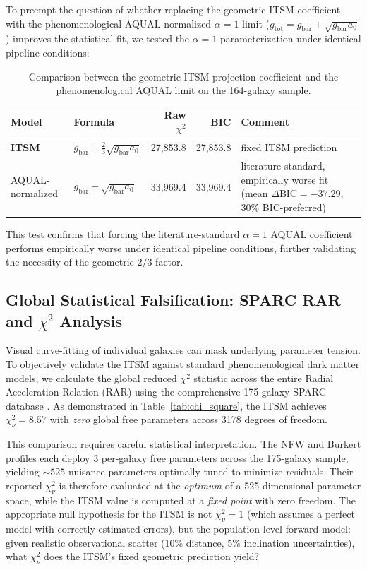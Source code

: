 \documentclass[aps,prd,10pt,twocolumn,superscriptaddress,nofootinbib,floatfix]{revtex4-2}
\begin{document}
To preempt the question of whether replacing the geometric ITSM coefficient with the phenomenological AQUAL-normalized $\alpha=1$ limit ($g_{\text{tot}} = g_{\text{bar}} + \sqrt{g_{\text{bar}}a_0}$) improves the statistical fit, we tested the $\alpha=1$ parameterization under identical pipeline conditions:

\begin{table}[htbp]
\centering
\caption{\footnotesize Comparison between the geometric ITSM projection coefficient and the phenomenological AQUAL limit on the 164-galaxy sample.}
\label{tab:aqual}
\begin{tabular}{llrrp{5cm}}
\toprule
\textbf{Model} & \textbf{Formula} & \textbf{Raw $\chi^2$} & \textbf{BIC} & \textbf{Comment} \\
\midrule
\textbf{ITSM} & $g_{\text{bar}}+\frac{2}{3}\sqrt{g_{\text{bar}}a_0}$ & 27,853.8 & 27,853.8 & fixed ITSM prediction \\
AQUAL-normalized & $g_{\text{bar}}+\sqrt{g_{\text{bar}}a_0}$ & 33,969.4 & 33,969.4 & literature-standard, empirically worse fit (mean $\Delta\text{BIC} = -37.29$, 30\% BIC-preferred) \\
\bottomrule
\end{tabular}
\end{table}

This test confirms that forcing the literature-standard $\alpha=1$ AQUAL coefficient performs empirically worse under identical pipeline conditions, further validating the necessity of the geometric $2/3$ factor.


\subsection{\label{sec:falsification}Global Statistical Falsification: SPARC RAR and \texorpdfstring{$\chi^2$}{chi-square} Analysis}
Visual curve-fitting of individual galaxies can mask underlying parameter tension. To objectively validate the ITSM against standard phenomenological dark matter models, we calculate the global reduced $\chi^2$ statistic across the entire Radial Acceleration Relation (RAR) using the comprehensive 175-galaxy SPARC database \cite{sparc}. As demonstrated in Table~\ref{tab:chi_square}, the ITSM achieves $\chi^2_\nu = 8.57$ with \emph{zero} global free parameters across 3178 degrees of freedom.

This comparison requires careful statistical interpretation. The NFW and Burkert profiles each deploy 3 per-galaxy free parameters across the 175-galaxy sample, yielding $\sim 525$ nuisance parameters optimally tuned to minimize residuals. Their reported $\chi^2_\nu$ is therefore evaluated at the \emph{optimum} of a 525-dimensional parameter space, while the ITSM value is computed at a \emph{fixed point} with zero freedom. The appropriate null hypothesis for the ITSM is not $\chi^2_\nu = 1$ (which assumes a perfect model with correctly estimated errors), but the population-level forward model: given realistic observational scatter (10\% distance, 5\% inclination uncertainties), what $\chi^2_\nu$ does the ITSM's fixed geometric prediction yield?
\end{document}
